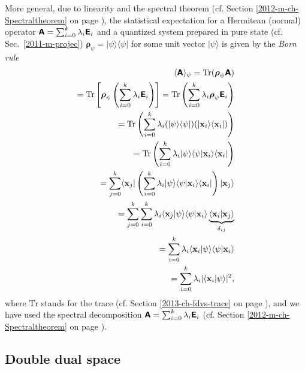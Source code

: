 {More general,  due to linearity and the spectral theorem
(cf. Section \ref{2012-m-ch-Spectraltheorem} on page \pageref{2012-m-ch-Spectraltheorem}),
the statistical expectation for a Hermitean (normal) operator $\textsf{\textbf{A}}=
\sum_{i=0}^k   \lambda_i \textsf{\textbf{E}}_i$
and a quantized system prepared in pure state
(cf. Sec.~\ref{2011-m-projec})
$\boldsymbol{\rho}_\psi = \vert {\psi}\rangle \langle \psi \vert$ for some unit vector $\vert {\psi}\rangle$
is given by the {\em Born rule}
\begin{equation}
\begin{split}
\langle \textsf{\textbf{A}}\rangle_{\psi} = \text{Tr} (\boldsymbol{\rho}_\psi \textsf{\textbf{A}})\\
=
\text{Tr}  \left[\boldsymbol{\rho}_\psi  \left(\sum_{i=0}^k   \lambda_i  \textsf{\textbf{E}}_i  \right)\right] =
\text{Tr}  \left(\sum_{i=0}^k   \lambda_i \boldsymbol{\rho}_\psi  \textsf{\textbf{E}}_i  \right)\\
=
 \text{Tr} \left(\sum_{i=0}^k   \lambda_i (\vert \psi \rangle \langle \psi \vert )( \vert {\bf x}_i \rangle \langle {\bf x}_i \vert )\right)\\
=
 \text{Tr} \left(\sum_{i=0}^k   \lambda_i  \vert \psi \rangle \langle \psi \vert   {\bf x}_i \rangle \langle {\bf x}_i \vert  \right)\\
=
\sum_{j=0}^k \langle {\bf x}_j \vert
\left(  \sum_{i=0}^k   \lambda_i  \vert \psi \rangle  \langle \psi   \vert {\bf x}_i \rangle   \langle {\bf x}_i \vert \right)   \vert{\bf x}_j \rangle    \\
=
\sum_{j=0}^k
   \sum_{i=0}^k   \lambda_i  \langle {\bf x}_j \vert \psi \rangle   \langle \psi   \vert {\bf x}_i \rangle
\underbrace{ \langle {\bf x}_i \vert    {\bf x}_j \rangle }_{\delta_{ij}}  \\
=
\sum_{i=0}^k   \lambda_i  \langle {\bf x}_i \vert \psi \rangle \langle \psi   \vert {\bf x}_i \rangle
\\
=
\sum_{i=0}^k   \lambda_i \vert \langle {\bf x}_i \vert \psi \rangle \vert^2,
\end{split}
\end{equation}
where $\text{Tr}$ stands for the trace (cf. Section \ref{2013-ch-fdvs-trace} on page \pageref{2013-ch-fdvs-trace}),
and we have used the spectral decomposition $\textsf{\textbf{A}}= \sum_{i=0}^k   \lambda_i \textsf{\textbf{E}}_i$
(cf. Section \ref{2012-m-ch-Spectraltheorem} on page \pageref{2012-m-ch-Spectraltheorem}).
}


\subsection{Double dual space}
\label{2012-m-dds}

